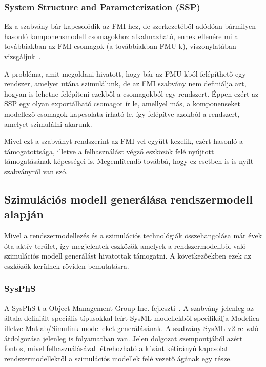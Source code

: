         \subsubsection{System Structure and Parameterization (SSP)} \label{sec:ssp}
        Ez a szabvány bár kapcsolódik az FMI-hez, de szerkezetéből adódóan bármilyen hasonló
        komponensmodell csomagokhoz alkalmazható, ennek ellenére mi a továbbiakban az FMI csomagok (a
        továbbiakban FMU-k), viszonylatában vizsgáljuk~\cite{SSP2022}.
        
        A probléma, amit megoldani hivatott, hogy bár az FMU-kból felépíthető egy rendszer, amelyet utána szimulálunk,
        de az FMI szabvány nem definiálja azt, hogyan is lehetne felépíteni ezekből a csomagokból egy rendszert.
        Éppen ezért az SSP egy olyan exportálható csomagot ír le, amellyel más, a komponenseket modellező csomagok kapcsolata írható le,
        így felépítve azokból a rendszert, amelyet szimulálni akarunk.
        
        Mivel ezt a szabványt rendszerint az FMI-vel együtt kezelik, ezért hasonló a támogatottsága, illetve a felhasználást végző eszközök felé nyújtott
        támogatásának képességei is. Megemlítendő továbbá, hogy ez esetben is is nyílt szabványról van szó.

    \subsection{Szimulációs modell generálása rendszermodell alapján}
    Mivel a rendszermodellezés és a szimulációs technológiák összehangolása már évek óta aktív terület, így megjelentek eszközök amelyek a rendszermodellből való szimulációs modell generálást hivatottak támogatni. A következőekben ezek az eszközök kerülnek röviden bemutatásra.

        \subsubsection{SysPhS} \label{sec:SysPhS}
        A SysPhS-t a Object Management Group Inc. fejleszti~\cite{SysPhS2021}. A szabvány jelenleg az általa definiált speciális típusokkal leírt SysML modellekből specifikálja Modelica illetve Matlab/Simulink modelleket generálásának.
        A szabvány SysML v2-re való átdolgozása jelenleg is folyamatban van. Jelen dolgozat szempontjából azért fontos, mivel felhasználásával létrehozható a kívánt kétirányú kapcsolat rendszermodellektől a szimulációs modellek felé vezető ágának egy része.


